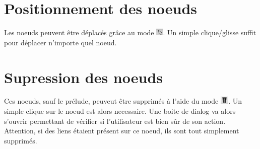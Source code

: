 	\section{Positionnement des noeuds}
		Les noeuds peuvent être déplacés grâce au mode \includegraphics[height=10pt]{img/modeSelected.png}. Un simple clique/glisse suffit pour déplacer n'importe quel noeud.

	\section{Supression des noeuds}
		Ces noeuds, sauf le prélude, peuveut être supprimés à l'aide du mode \includegraphics[height=0.4cm]{img/modeSupression.png}. Un simple clique sur le noeud est alors necessaire. Une boite de dialog va alors s'ouvrir permettant de vérifier si l'utilisateur est bien sûr de son action. Attention, si des liens étaient présent sur ce noeud, ils sont tout simplement supprimés.
